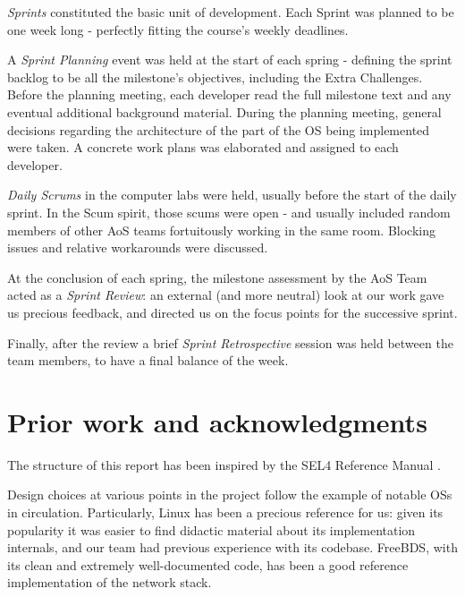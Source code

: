 \documentclass[a4paper,twoside,openright]{report}
\begin{document}
\textit{Sprints} constituted the basic unit of development. Each Sprint was planned to be one week long - perfectly fitting the course's weekly deadlines. 

A \textit{Sprint Planning} event was held at the start of each spring - defining the sprint backlog to be all the milestone's objectives, including the Extra Challenges. Before the planning meeting, each developer read the full milestone text and any eventual additional background material. During the planning meeting, general decisions regarding the architecture of the part of the OS being implemented were taken. A concrete work plans was elaborated and assigned to each developer.

\textit{Daily Scrums} in the computer labs were held, usually before the start of the daily sprint. In the Scum spirit, those scums were open - and usually included random members of other AoS teams fortuitously working in the same room. Blocking issues and relative workarounds were discussed.

At the conclusion of each spring, the milestone assessment by the AoS Team acted as a \textit{Sprint Review}: an external (and more neutral) look at our work gave us precious feedback, and directed us on the focus points for the successive sprint.

Finally, after the review a brief \textit{Sprint Retrospective} session was held between the team members, to have a final balance of the week.

\section{Prior work and acknowledgments}
The structure of this report has been inspired by the SEL4 Reference Manual \cite{sel4}.

Design choices at various points in the project follow the example of notable OSs in circulation. Particularly, Linux has been a precious reference for us: given its popularity it was easier to find didactic material about its implementation internals, and our team had previous experience with its codebase. FreeBDS, with its clean and extremely well-documented code, has been a good reference implementation of the network stack.
\end{document}
